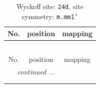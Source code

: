 \documentclass[fleqn,8pt]{jsarticle}
\begin{document}
\renewcommand{\arraystretch}{1.2}
\begin{longtable}{ccc}
\caption{Wyckoff site: {\tt 24d}, site symmetry: {\tt m.mm1'}}
 \\
 \hline \hline
No. & position & mapping \\ \hline \endfirsthead

\multicolumn{2}{l}{\tablename\ \thetable{}} \\
 \hline \hline
No. & position & mapping \\ \hline \endhead

 \hline \hline
\multicolumn{2}{r}{\footnotesize\it continued ...} \\ \endfoot

 \hline \hline
\multicolumn{2}{r}{} \\ \endlastfoot


\end{longtable}
\end{document}
